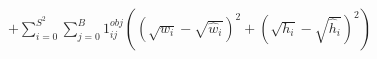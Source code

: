 \documentclass[preview]{standalone}
\begin{document}
\begin{align*}
+ \sum_{i=0}^{S^2}\sum_{j=0}^{B}1_{ij}^{obj}\left((\sqrt{w_i}-\sqrt{\hat{w}_i})^2+(\sqrt{h_i}-\sqrt{\hat{h}_i})^2\right)
\end{align*}
\end{document}
